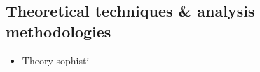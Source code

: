 \subsection{Theoretical techniques \& analysis methodologies}

\begin{itemize}
\item Theory sophisti
\end{itemize}